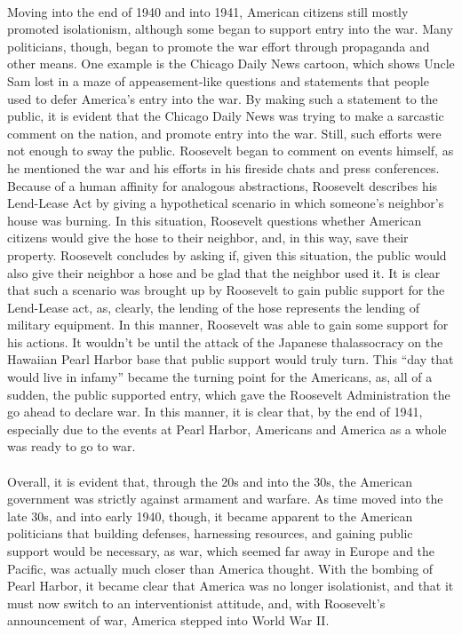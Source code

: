 \documentclass[12pt]{article}
\begin{document}
\paragraph{} Moving into the end of 1940 and into 1941, American citizens still mostly promoted isolationism, although some began to support entry into the war. Many politicians, though, began to promote the war effort through propaganda and other means. One example is the Chicago Daily News cartoon, which shows Uncle Sam lost in a maze of appeasement-like questions and statements that people used to defer America's entry into the war. By making such a statement to the public, it is evident that the Chicago Daily News was trying to make a sarcastic comment on the nation, and promote entry into the war. Still, such efforts were not enough to sway the public. Roosevelt began to comment on events himself, as he mentioned the war and his efforts in his fireside chats and press conferences. Because of a human affinity for analogous abstractions, Roosevelt describes his Lend-Lease Act by giving a hypothetical scenario in which someone's neighbor's house was burning. In this situation, Roosevelt questions whether American citizens would give the hose to their neighbor, and, in this way, save their property. Roosevelt concludes by asking if, given this situation, the public would also give their neighbor a hose and be glad that the neighbor used it. It is clear that such a scenario was brought up by Roosevelt to gain public support for the Lend-Lease act, as, clearly, the lending of the hose represents the lending of military equipment. In this manner, Roosevelt was able to gain some support for his actions. It wouldn't be until the attack of the Japanese thalassocracy on the Hawaiian Pearl Harbor base that public support would truly turn. This “day that would live in infamy” became the turning point for the Americans, as, all of a sudden, the public supported entry, which gave the Roosevelt Administration the go ahead to declare war. In this manner, it is clear that, by the end of 1941, especially due to the events at Pearl Harbor, Americans and America as a whole was ready to go to war.

\paragraph{} Overall, it is evident that, through the 20s and into the 30s, the American government was strictly against armament and warfare. As time moved into the late 30s, and into early 1940, though, it became apparent to the American politicians that building defenses, harnessing resources, and gaining public support would be necessary, as war, which seemed far away in Europe and the Pacific, was actually much closer than America thought. With the bombing of Pearl Harbor, it became clear that America was no longer isolationist, and that it must now switch to an interventionist attitude, and, with Roosevelt's announcement of war, America stepped into World War II.
\end{document}
